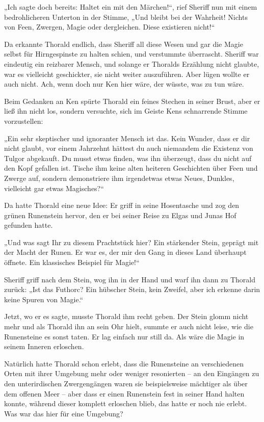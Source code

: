 \documentclass[10pt, a4paper, oneside]{book}
\begin{document}
„Ich sagte doch bereits: Haltet ein mit den Märchen!“, rief Sheriff nun mit einem bedrohlicheren Unterton in der Stimme, „Und bleibt bei der Wahrheit! Nichts von Feen, Zwergen, Magie oder dergleichen. Diese existieren nicht!“

Da erkannte Thorald endlich, dass Sheriff all diese Wesen und gar die Magie selbst für Hirngespinste zu halten schien, und verstummte überrascht. Sheriff war eindeutig ein reizbarer Mensch, und solange er Thoralds Erzählung nicht glaubte, war es vielleicht geschickter, sie nicht weiter auszuführen. Aber lügen wollte er auch nicht. Ach, wenn doch nur Ken hier wäre, der wüsste, was zu tun wäre.

Beim Gedanken an Ken spürte Thorald ein feines Stechen in seiner Brust, aber er ließ ihn nicht los, sondern versuchte, sich im Geiste Kens schnarrende Stimme vorzustellen:

„Ein sehr skeptischer und ignoranter Mensch ist das. Kein Wunder, dass er dir nicht glaubt, vor einem Jahrzehnt hättest du auch niemandem die Existenz von Tulgor abgekauft. Du musst etwas finden, was ihn überzeugt, dass du nicht auf den Kopf gefallen ist. Tische ihm keine alten heiteren Geschichten über Feen und Zwerge auf, sondern demonstriere ihm irgendetwas etwas Neues, Dunkles, vielleicht gar etwas Magisches?“

Da hatte Thorald eine neue Idee: Er griff in seine Hosentasche und zog den grünen Runenstein hervor, den er bei seiner Reise zu Elgas und Junas Hof gefunden hatte.

„Und was sagt Ihr zu diesem Prachtstück hier? Ein stärkender Stein, geprägt mit der Macht der Runen. Er war es, der mir den Gang in dieses Land überhaupt öffnete. Ein klassisches Beispiel für Magie!“

Sheriff griff nach dem Stein, wog ihn in der Hand und warf ihn dann zu Thorald zurück: „Ist das Futhorc? Ein hübscher Stein, kein Zweifel, aber ich erkenne darin keine Spuren von Magie.“

Jetzt, wo er es sagte, musste Thorald ihm recht geben. Der Stein glomm nicht mehr und als Thorald ihn an sein Ohr hielt, summte er auch nicht leise, wie die Runensteine es sonst taten. Er lag einfach nur still da. Als wäre die Magie in seinem Inneren erloschen.

Natürlich hatte Thorald schon erlebt, dass die Runensteine an verschiedenen Orten mit ihrer Umgebung mehr oder weniger resonierten – an den Eingängen zu den unterirdischen Zwergengängen waren sie beispielsweise mächtiger als über dem offenen Meer – aber dass er einen Runenstein fest in seiner Hand halten konnte, während dieser komplett erloschen blieb, das hatte er noch nie erlebt. Was war das hier für eine Umgebung?
\end{document}
